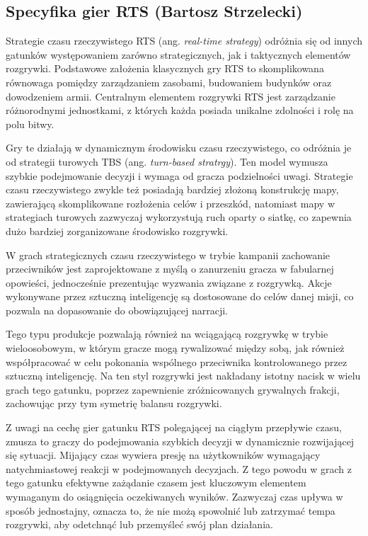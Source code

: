 \subsection{Specyfika gier RTS (Bartosz Strzelecki)}\label{ss:rts}
Strategie czasu rzeczywistego RTS (ang. \textit{real-time strategy}) odróżnia się od innych gatunków występowaniem zarówno strategicznych, jak i taktycznych
elementów rozgrywki. Podstawowe założenia klasycznych gry RTS to skomplikowana równowaga pomiędzy zarządzaniem zasobami, budowaniem budynków oraz
dowodzeniem armii. Centralnym elementem rozgrywki RTS jest zarządzanie różnorodnymi jednostkami, z których każda posiada unikalne zdolności i rolę na polu bitwy.

Gry te działają w dynamicznym środowisku czasu rzeczywistego, co odróżnia je od strategii turowych TBS (ang.  \textit{turn-based stratrgy}). Ten model wymusza szybkie podejmowanie decyzji
i wymaga od gracza podzielności uwagi. Strategie czasu rzeczywistego zwykle też posiadają bardziej złożoną konstrukcję mapy, zawierającą skomplikowane
rozłożenia celów i przeszkód, natomiast mapy w strategiach turowych zazwyczaj wykorzystują ruch oparty o siatkę, co zapewnia dużo bardziej
zorganizowane środowisko rozgrywki.

W grach strategicznych czasu rzeczywistego w trybie kampanii zachowanie przeciwników jest zaprojektowane z myślą o zanurzeniu gracza w fabularnej opowieści, jednocześnie
prezentując wyzwania związane z rozgrywką. Akcje wykonywane przez sztuczną inteligencję są dostosowane do celów danej misji, co pozwala
na dopasowanie do obowiązującej narracji.

Tego typu produkcje pozwalają również na wciągającą rozgrywkę w trybie wieloosobowym, w którym gracze mogą rywalizować między sobą, jak również
współpracować w celu pokonania wspólnego przeciwnika kontrolowanego przez sztuczną inteligencję. Na ten styl rozgrywki jest nakładany istotny nacisk
w wielu grach tego gatunku, poprzez zapewnienie zróżnicowanych grywalnych frakcji, zachowując przy tym symetrię balansu rozgrywki.

Z uwagi na cechę gier gatunku RTS polegającej na ciągłym przepływie czasu, zmusza to graczy
do podejmowania szybkich decyzji w dynamicznie rozwijającej się sytuacji. Mijający czas
wywiera presję na użytkowników wymagający natychmiastowej reakcji w podejmowanych decyzjach.
Z tego powodu w grach z tego gatunku efektywne zażądanie czasem jest kluczowym elementem
wymaganym do osiągnięcia oczekiwanych wyników. Zazwyczaj czas upływa w sposób jednostajny, oznacza to, że
nie możą spowolnić lub zatrzymać tempa rozgrywki, aby odetchnąć lub przemyśleć swój plan działania.

